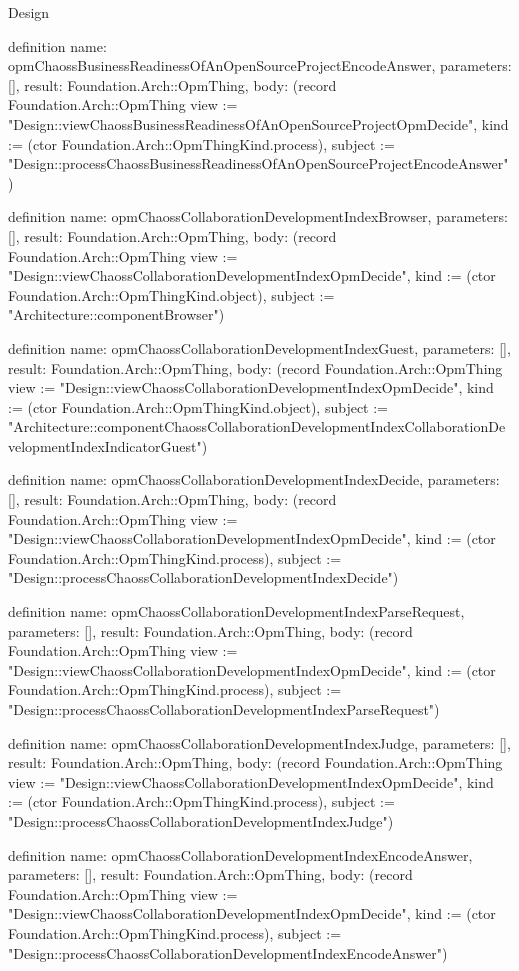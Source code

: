 \begin{lexlean}{Design}
\begin{semanticmodule}
definition{
  name: opmChaossBusinessReadinessOfAnOpenSourceProjectEncodeAnswer,
  parameters: [],
  result: Foundation.Arch::OpmThing,
  body: (record Foundation.Arch::OpmThing {view := "Design::viewChaossBusinessReadinessOfAnOpenSourceProjectOpmDecide", kind := (ctor Foundation.Arch::OpmThingKind.process), subject := "Design::processChaossBusinessReadinessOfAnOpenSourceProjectEncodeAnswer"})
}

definition{
  name: opmChaossCollaborationDevelopmentIndexBrowser,
  parameters: [],
  result: Foundation.Arch::OpmThing,
  body: (record Foundation.Arch::OpmThing {view := "Design::viewChaossCollaborationDevelopmentIndexOpmDecide", kind := (ctor Foundation.Arch::OpmThingKind.object), subject := "Architecture::componentBrowser"})
}

definition{
  name: opmChaossCollaborationDevelopmentIndexGuest,
  parameters: [],
  result: Foundation.Arch::OpmThing,
  body: (record Foundation.Arch::OpmThing {view := "Design::viewChaossCollaborationDevelopmentIndexOpmDecide", kind := (ctor Foundation.Arch::OpmThingKind.object), subject := "Architecture::componentChaossCollaborationDevelopmentIndexCollaborationDevelopmentIndexIndicatorGuest"})
}

definition{
  name: opmChaossCollaborationDevelopmentIndexDecide,
  parameters: [],
  result: Foundation.Arch::OpmThing,
  body: (record Foundation.Arch::OpmThing {view := "Design::viewChaossCollaborationDevelopmentIndexOpmDecide", kind := (ctor Foundation.Arch::OpmThingKind.process), subject := "Design::processChaossCollaborationDevelopmentIndexDecide"})
}

definition{
  name: opmChaossCollaborationDevelopmentIndexParseRequest,
  parameters: [],
  result: Foundation.Arch::OpmThing,
  body: (record Foundation.Arch::OpmThing {view := "Design::viewChaossCollaborationDevelopmentIndexOpmDecide", kind := (ctor Foundation.Arch::OpmThingKind.process), subject := "Design::processChaossCollaborationDevelopmentIndexParseRequest"})
}

definition{
  name: opmChaossCollaborationDevelopmentIndexJudge,
  parameters: [],
  result: Foundation.Arch::OpmThing,
  body: (record Foundation.Arch::OpmThing {view := "Design::viewChaossCollaborationDevelopmentIndexOpmDecide", kind := (ctor Foundation.Arch::OpmThingKind.process), subject := "Design::processChaossCollaborationDevelopmentIndexJudge"})
}

definition{
  name: opmChaossCollaborationDevelopmentIndexEncodeAnswer,
  parameters: [],
  result: Foundation.Arch::OpmThing,
  body: (record Foundation.Arch::OpmThing {view := "Design::viewChaossCollaborationDevelopmentIndexOpmDecide", kind := (ctor Foundation.Arch::OpmThingKind.process), subject := "Design::processChaossCollaborationDevelopmentIndexEncodeAnswer"})
}


\end{semanticmodule}
\end{lexlean}
